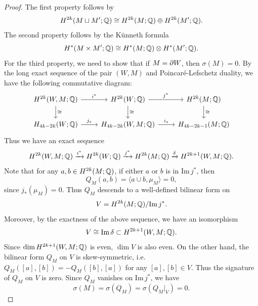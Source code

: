 \begin{proof}
    The first property follows by 
    \begin{equation*}
        H^{2k}(M \sqcup M';\mathbb{Q}) \cong H^{2k}(M;\mathbb{Q}) \oplus H^{2k}(M';\mathbb{Q}).
    \end{equation*}
    The second property follows by the K\"unneth formula
    \begin{equation*}
        H^*(M \times M';\mathbb{Q}) \cong H^*(M;\mathbb{Q}) \otimes H^*(M';\mathbb{Q}).
    \end{equation*}
    For the third property, we need to show that if $M = \partial W$, then $\sigma(M) = 0$.
    By the long exact sequence of the pair $(W,M)$ and Poincar\'e-Lefschetz duality, we have the following commutative diagram:
    \begin{equation*}
        \begin{tikzcd}
            H^{2k}(W,M;\mQ) \arrow[r, "i^*"] \arrow[d, "\cong"] & H^{2k}(W;\mQ) \arrow[r, "j^*"] \arrow[d, "\cong"] & H^{2k}(M;\mQ) \arrow[d, "\cong"] \\
            H_{4k-2k}(W;\mQ) \arrow[r, "j_*"] & H_{4k-2k}(W,M;\mQ) \arrow[r, "i_*"] & H_{4k-2k-1}(M;\mQ)
        \end{tikzcd}
    \end{equation*}
    Thus we have an exact sequence
    \begin{equation*}
        H^{2k}(W,M;\mathbb{Q}) \xrightarrow{i^*} H^{2k}(W;\mathbb{Q}) \xrightarrow{j^*} H^{2k}(M;\mathbb{Q}) \xrightarrow{\delta} H^{2k+1}(W,M;\mathbb{Q}).
    \end{equation*}
    Note that for any $a,b\in H^{2k}(M;\mathbb{Q})$, if either $a$ or $b$ is in $\mathrm{Im}\, j^*$, then 
    \begin{equation*}
        Q_M(a,b) = \langle a\cup b, \mu_M \rangle = 0,
    \end{equation*}
    since $j_* (\mu_M) = 0$. Thus $Q_M$ descends to a well-defined bilinear form on 
    \begin{equation*}
        V = H^{2k}(M;\mathbb{Q})/\mathrm{Im}\, j^*.
    \end{equation*}
    Moreover, by the exactness of the above sequence, we have an isomorphism
    \begin{equation*}
        V \cong \mathrm{Im}\, \delta \subset H^{2k+1}(W,M;\mathbb{Q}).
    \end{equation*}
    Since $\dim H^{2k+1}(W,M;\mathbb{Q})$ is even, $\dim V$ is also even.
    On the other hand, the bilinear form $Q_M$ on $V$ is skew-symmetric, i.e. $Q_M([a],[b]) = - Q_M([b],[a])$ for any $[a],[b]\in V$.
    Thus the signature of $Q_M$ on $V$ is zero. Since $Q_M$ vanishes on $\mathrm{Im}\, j^*$, we have
    \begin{equation*}
        \sigma(M) = \sigma(Q_M) = \sigma(Q_M|_V) = 0.
    \end{equation*}
\end{proof}
